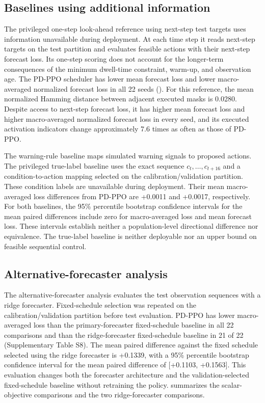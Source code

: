 

\subsection{Baselines using additional information}
\label{sec:information_references}

The privileged one-step look-ahead reference using next-step test targets uses
information unavailable during deployment. At each time step it reads next-step targets on
the test partition and evaluates feasible actions with their next-step forecast
loss. Its one-step scoring does not account for the longer-term consequences of
the minimum dwell-time constraint, warm-up, and observation age. The PD-PPO scheduler
has lower mean forecast loss and lower macro-averaged normalized forecast loss
in all 22 seeds
(). For this reference, the mean normalized
Hamming distance between adjacent executed masks is 0.0280. Despite
access to next-step forecast loss, it has higher mean forecast loss and higher
macro-averaged normalized forecast loss in every seed, and its executed activation indicators change approximately 7.6 times as often as those of
PD-PPO.

The warning-rule baseline maps simulated warning signals to proposed actions.
The privileged true-label baseline uses the exact sequence $c_t,\ldots,c_{t+16}$
and a condition-to-action mapping selected on the calibration/validation
partition. These condition labels are unavailable during deployment.
Their mean macro-averaged loss differences from PD-PPO are
+0.0011 and +0.0017, respectively. For both baselines, the 95\% percentile
bootstrap confidence intervals for the mean paired differences include zero
for macro-averaged loss and mean forecast loss. These intervals establish neither
a population-level directional difference nor equivalence. The true-label baseline is neither
deployable nor an upper bound on feasible sequential control.

\subsection{Alternative-forecaster analysis}
\label{sec:secondary_forecaster}

The alternative-forecaster analysis evaluates the test observation sequences
with a ridge forecaster. Fixed-schedule selection was repeated on the
calibration/validation partition before test evaluation. PD-PPO has lower
macro-averaged loss than the primary-forecaster fixed-schedule baseline in all 22
comparisons and than the ridge-forecaster fixed-schedule baseline in 21 of 22
(Supplementary Table S8).
The mean paired difference against the fixed
schedule selected using the ridge forecaster is +0.1339,
with a 95\% percentile bootstrap confidence interval for the mean paired
difference of [+0.1103, +0.1563]. This evaluation changes both
the forecaster architecture and the validation-selected fixed-schedule baseline without retraining the
policy.
 summarizes the scalar-objective comparisons and the two
ridge-forecaster comparisons.

